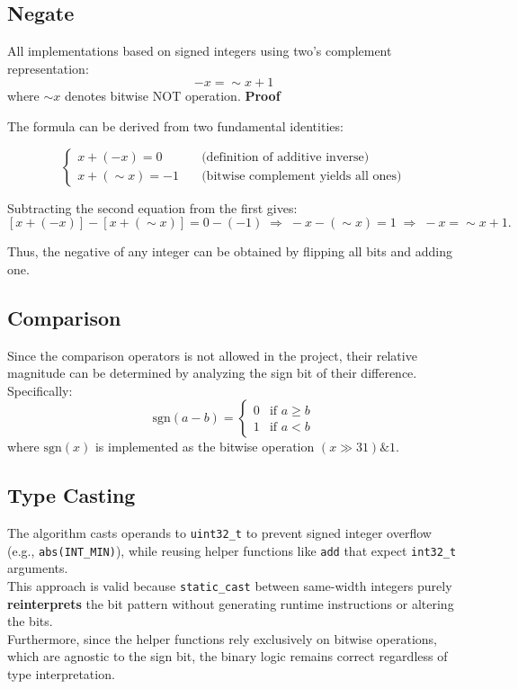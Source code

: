 \documentclass[11pt]{article}
\begin{document}
\subsection{Negate}
All implementations based on signed integers using two's complement representation:
\[
-x = \sim x + 1
\]
where $\sim x$ denotes bitwise NOT operation.
\newpage
\textbf{Proof} 

The formula can be derived from two fundamental identities:

\[
\begin{cases}
x + (-x) = 0 \quad &\text{(definition of additive inverse)} \\[4pt]
x + (\sim x) = -1 \quad &\text{(bitwise complement yields all ones)}
\end{cases}
\]

Subtracting the second equation from the first gives:
\[
[x + (-x)] - [x + (\sim x)] = 0 - (-1) \;\Longrightarrow\; -x - (\sim x) = 1 \;\Longrightarrow\; -x = \sim x + 1.
\]

Thus, the negative of any integer can be obtained by flipping all bits and adding one.

\subsection{Comparison}
Since the comparison operators is not allowed in the project, their relative magnitude can be determined by analyzing the sign bit of their difference. Specifically:
\[
\text{sgn}(a - b) = 
\begin{cases}
0 & \text{if } a \geq b \\
1 & \text{if } a < b
\end{cases}
\]
where $\text{sgn}(x)$ is implemented as the bitwise operation $(x \gg 31) \& 1$.

\subsection{Type Casting}
The algorithm casts operands to \texttt{uint32\_t} to prevent signed integer overflow (e.g., \texttt{abs(INT\_MIN)}), while reusing helper functions like \texttt{add} that expect \texttt{int32\_t} arguments. 
\vspace{3pt}\\
This approach is valid because \texttt{static\_cast} between same-width integers purely \textbf{reinterprets} the bit pattern without generating runtime instructions or altering the bits. 
\vspace{3pt}\\
Furthermore, since the helper functions rely exclusively on bitwise operations, which are agnostic to the sign bit, the binary logic remains correct regardless of type interpretation.
\newpage
\end{document}
